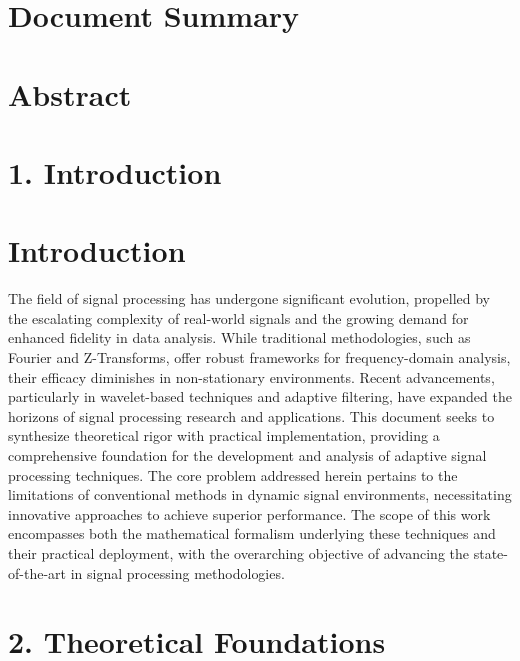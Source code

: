 \documentclass{article}
\title{}
\author{}
\date{\today}
\begin{document}
\maketitle
\section*{Document Summary}


\section*{Abstract}


\section*{1. Introduction}


\section{Introduction}

The field of signal processing has undergone significant evolution, propelled by the escalating complexity of real-world signals and the growing demand for enhanced fidelity in data analysis. While traditional methodologies, such as Fourier and Z-Transforms, offer robust frameworks for frequency-domain analysis, their efficacy diminishes in non-stationary environments. Recent advancements, particularly in wavelet-based techniques and adaptive filtering, have expanded the horizons of signal processing research and applications. This document seeks to synthesize theoretical rigor with practical implementation, providing a comprehensive foundation for the development and analysis of adaptive signal processing techniques. The core problem addressed herein pertains to the limitations of conventional methods in dynamic signal environments, necessitating innovative approaches to achieve superior performance. The scope of this work encompasses both the mathematical formalism underlying these techniques and their practical deployment, with the overarching objective of advancing the state-of-the-art in signal processing methodologies.



\section*{2. Theoretical Foundations}
\end{document}
